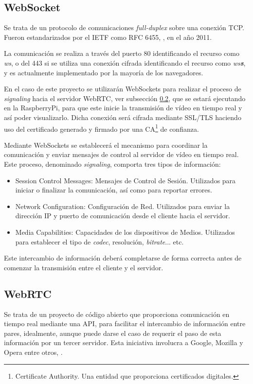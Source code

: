 \subsection{WebSocket}
\label{subsec:WebSocket}
Se trata de un protocolo de comunicaciones \emph{full-duplex} sobre una conexión TCP. Fueron estandarizados por el IETF como RFC 6455, \citep{wiki:WebSocket6455, wiki:WebSocketWiki}, en el año 2011.  

La comunicación se realiza a través del puerto 80 identificando el recurso como \textit{ws}, o del 443 si se utiliza una conexión cifrada  identificando el recurso como \textit{ws\textbf{s}}, y es actualmente implementado por la mayoría de los navegadores. 

En el caso de este proyecto se utilizarán WebSockets para realizar el proceso de \textit{signaling} hacia el servidor WebRTC, ver subsección \ref{subsec:WebRTC}, que se estará ejecutando en la RaspberryPi, para que este inicie la transmisión de vídeo en tiempo real y así poder visualizarlo. Dicha conexión será cifrada mediante SSL/TLS haciendo uso del certificado generado y firmado por una CA\footnote{Certificate Authority. Una entidad que proporciona certificados digitales.} de confianza.

Mediante WebSockets se establecerá el mecanismo para coordinar la comunicación y enviar mensajes de control al servidor de vídeo en tiempo real. Este proceso, denominado \textit{signaling}, comporta tres tipos de información:
\begin{itemize}
\item Session Control Messages: Mensajes de Control de Sesión. Utilizados para iniciar o finalizar la comunicación, así como para reportar errores.
\item Network Configuration: Configuración de Red. Utilizados para enviar la dirección IP y puerto de comunicación desde el cliente hacia el servidor.
\item Media Capabilities: Capacidades de los dispositivos de Medios. Utilizados para establecer el tipo de \emph{codec}, resolución, \emph{bitrate}... etc.
\end{itemize}

Este intercambio de información deberá completarse de forma correcta antes de comenzar la transmisión entre el cliente y el servidor. 


\subsection{WebRTC}
\label{subsec:WebRTC}
Se trata de un proyecto de código abierto que proporciona comunicación en tiempo real mediante una API, para facilitar el intercambio de información entre pares, idealmente, aunque puede darse el caso de requerir el paso de esta información por un tercer servidor. Esta iniciativa involucra a Google, Mozilla y Opera entre otros, \citep{wiki:WebRTCorg, wiki:WebRTCmdn}.

